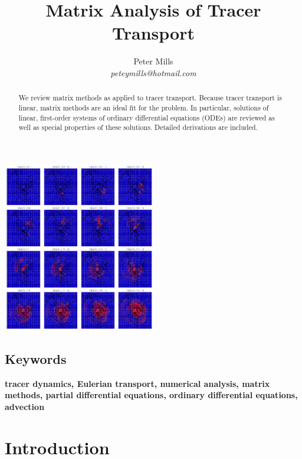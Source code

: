 \documentclass[11pt]{article}
\begin{document}
\title{Matrix Analysis of Tracer Transport}
\author{Peter Mills\\\textit{peteymills@hotmail.com}}

\maketitle

\begin{center}
\includegraphics[width=0.5\textwidth]{tt_cover_graphic}
\end{center}

\pagestyle{myheadings}

\begin{abstract}
We review matrix methods as applied to tracer transport.
Because tracer transport is linear, matrix methods are an ideal
fit for the problem.  In particular,
solutions of linear, first-order systems of ordinary differential
equations (ODEs) are reviewed as well as 
special properties of these solutions.
Detailed derivations are included.
\end{abstract}

\subsection*{Keywords}
\textbf{tracer dynamics, Eulerian transport, numerical analysis, matrix methods, partial differential equations, ordinary differential equations, advection}

\tableofcontents

\section{Introduction}
\end{document}
